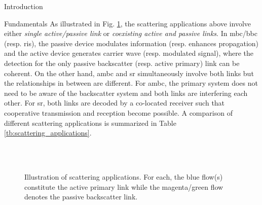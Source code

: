 \documentclass[journal]{IEEEtran}
\begin{document}
\begin{section}{Introduction}
\begin{subsection}{Fundamentals}
		As illustrated in Fig. \ref{fg:scatter_illustration}, the scattering applications above involve either \emph{single active/passive link} or \emph{coexisting active and passive links}.
		In \gls{mbc}/\gls{bbc} (resp. \gls{ris}), the passive device modulates information (resp. enhances propagation) and the active device generates carrier wave (resp. modulated signal), where the detection for the only passive backscatter (resp. active primary) link can be coherent.
		On the other hand, \gls{ambc} and \gls{sr} simultaneously involve both links but the relationships in between are different.
		For \gls{ambc}, the primary system does not need to be aware of the backscatter system and both links are interfering each other.
		For \gls{sr}, both links are decoded by a co-located receiver such that cooperative transmission and reception become possible.
		A comparison of different scattering applications is summarized in Table \ref{tb:scattering_applications}.

		\begin{figure}[!t]
			\centering
			\\
			\subfloat[\gls{sr}]{
				\resizebox{0.48\linewidth}{!}{
					
				}
				\label{fg:sr}
			}
			\\
			\subfloat[RIScatter]{
				\resizebox{0.48\linewidth}{!}{
					
				}
				\label{fg:riscatter}
			}
			\caption{
				Illustration of scattering applications.
				For each, the blue flow(s) constitute the active primary link while the magenta/green flow denotes the passive backscatter link.
			}
			\label{fg:scatter_illustration}
		\end{figure}
	\end{subsection}


\end{section}
\end{document}
